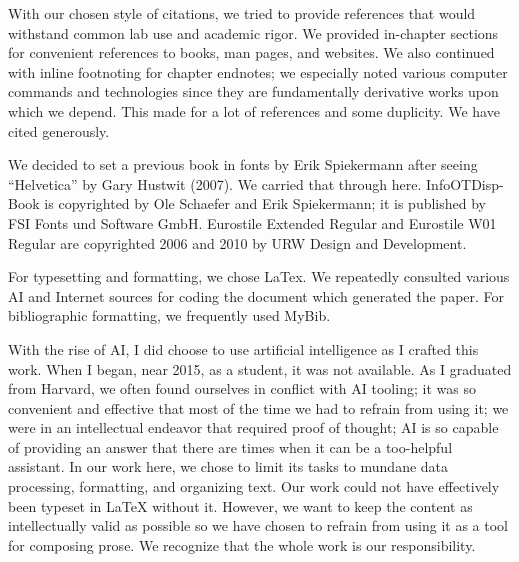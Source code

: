 With our chosen style of citations, we tried to provide references that would withstand common lab use and academic rigor.  We provided in-chapter sections for convenient references to books, man pages, and websites.  We also continued with inline footnoting for chapter endnotes; we especially noted various computer commands and technologies since they are fundamentally derivative works upon which we depend.  This made for a lot of references and some duplicity.  We have cited generously.

We decided to set a previous book in fonts by Erik Spiekermann after seeing ``Helvetica'' by Gary Hustwit (2007). We carried that through here.  InfoOTDisp-Book is copyrighted by Ole Schaefer and Erik Spiekermann; it is published by FSI Fonts und Software GmbH.  Eurostile Extended Regular and Eurostile W01 Regular are copyrighted 2006 and 2010 by URW Design and Development.

For typesetting and formatting, we chose LaTex.  We repeatedly consulted various AI and Internet sources for \gls{coding} the document which generated the paper.  For bibliographic formatting, we frequently used MyBib. 

With the rise of AI, I did choose to use artificial intelligence as I crafted this work.  When I began, near 2015, as a student, it was not available.  As I graduated from Harvard, we often found ourselves in conflict with AI tooling; it was so convenient and effective that most of the time we had to refrain from using it; we were in an intellectual endeavor that required proof of thought; AI is so capable of providing an answer that there are times when it can be a too-helpful assistant.  In our work here, we chose to limit its tasks to mundane data processing, formatting, and organizing text.  Our work could not have effectively been typeset in LaTeX without it.  However, we want to keep the content as intellectually valid as possible so we have chosen to refrain from using it as a tool for composing prose.  We recognize that the whole work is our responsibility.    

\markchapterendnotes